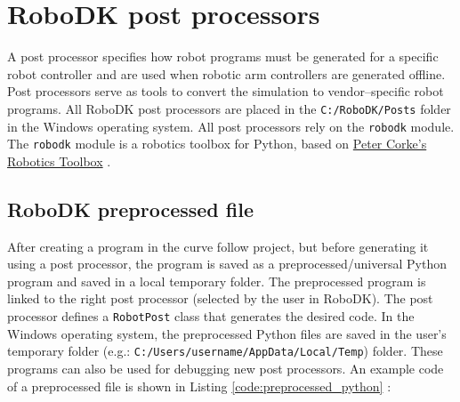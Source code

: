 \section{RoboDK post processors}

A post processor specifies how robot programs must be generated for a specific robot controller and are used when robotic arm controllers are generated offline. Post processors serve as tools to convert the simulation to vendor--specific robot programs. All RoboDK post processors are placed in the \texttt{C:/RoboDK/Posts} folder in the Windows operating system. All post processors rely on the \texttt{robodk} module. The \texttt{robodk} module is a robotics toolbox for Python, based on \href{http://petercorke.com/Robotics_Toolbox.html}{Peter Corke’s Robotics Toolbox} \cite{robodkapipython}. 

\subsection{RoboDK preprocessed file}

After creating a program in the curve follow project, but before generating it using a post processor, the program is saved as a preprocessed/universal Python program and saved in a local temporary folder. The preprocessed program is linked to the right post processor (selected by the user in RoboDK). The post processor defines a \texttt{RobotPost} class that generates the desired code. In the Windows operating system, the preprocessed Python files are saved in the user's temporary folder (e.g.: \texttt{C:/Users/username/AppData/Local/Temp}) folder. These programs can also be used for debugging new post processors. An example code of a preprocessed file is shown in Listing \ref{code:preprocessed_python} \cite{preprocessed}:



